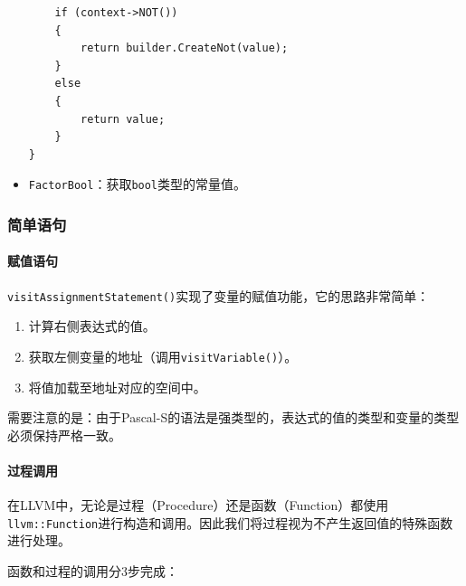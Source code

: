 \documentclass[lang=cn,11pt,a4paper,cite=authornum]{paper}
\begin{document}
\begin{itemize}
\begin{code}
\begin{verbatim}
    if (context->NOT())
    {
        return builder.CreateNot(value);
    }
    else
    {
        return value;
    }
}
    \end{verbatim}
          \end{code}
    \item \texttt{FactorBool}：获取\texttt{bool}类型的常量值。
\end{itemize}

\subsubsection{简单语句}

\paragraph{赋值语句}

\texttt{visitAssignmentStatement()}实现了变量的赋值功能，它的思路非常简单：

\begin{enumerate}
    \item 计算右侧表达式的值。
    \item 获取左侧变量的地址（调用\texttt{visitVariable()}）。
    \item 将值加载至地址对应的空间中。
\end{enumerate}

需要注意的是：由于Pascal-S的语法是强类型的，表达式的值的类型和变量的类型必须保持严格一致。

\paragraph{过程调用} \label{proccall}

在LLVM中，无论是过程（Procedure）还是函数（Function）都使用\texttt{llvm::Function}进行构造和调用。因此我们将过程视为不产生返回值的特殊函数进行处理。

函数和过程的调用分3步完成：
\end{document}
